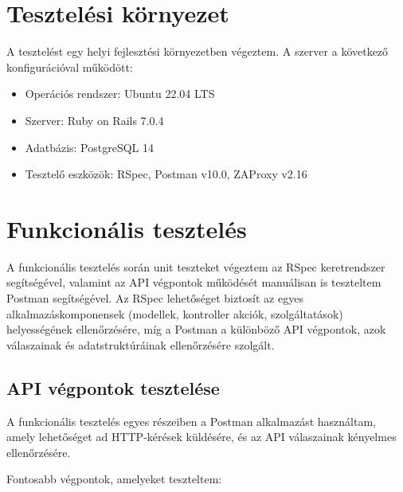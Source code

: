 \section{Tesztelési környezet}

A tesztelést egy helyi fejlesztési környezetben végeztem. A szerver a következő konfigurációval működött:
\begin{itemize}
    \item Operációs rendszer: Ubuntu 22.04 LTS
    \item Szerver: Ruby on Rails 7.0.4
    \item Adatbázis: PostgreSQL 14
    \item Tesztelő eszközök: RSpec, Postman v10.0, ZAProxy v2.16
\end{itemize}


\section{Funkcionális tesztelés}

A funkcionális tesztelés során unit teszteket végeztem az RSpec keretrendszer segítségével, valamint az API végpontok működését manuálisan is teszteltem Postman segítségével. Az RSpec lehetőséget biztosít az egyes alkalmazáskomponensek (modellek, kontroller akciók, szolgáltatások) helyességének ellenőrzésére, míg a Postman a különböző API végpontok, azok válaszainak és adatstruktúráinak ellenőrzésére szolgált.

\subsection{API végpontok tesztelése}

A funkcionális tesztelés egyes részeiben a Postman alkalmazást használtam, amely lehetőséget ad HTTP-kérések küldésére, és az API válaszainak kényelmes ellenőrzésére.

Fontosabb végpontok, amelyeket teszteltem:

